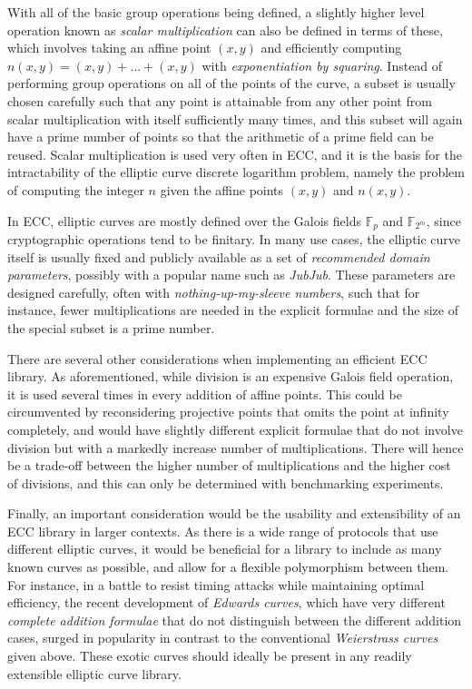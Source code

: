 \documentclass{article}
\theoremstyle{definition}
\newcommand{\F}{\mathbb{F}}
\begin{document}
With all of the basic group operations being defined, a slightly higher level operation known as \emph{scalar multiplication} can also be defined in terms of these, which involves taking an affine point $ (x, y) $ and efficiently computing $ n(x, y) = (x, y) + \dots + (x, y) $ with \emph{exponentiation by squaring}. Instead of performing group operations on all of the points of the curve, a subset is usually chosen carefully such that any point is attainable from any other point from scalar multiplication with itself sufficiently many times, and this subset will again have a prime number of points so that the arithmetic of a prime field can be reused. Scalar multiplication is used very often in ECC, and it is the basis for the intractability of the elliptic curve discrete logarithm problem, namely the problem of computing the integer $ n $ given the affine points $ (x, y) $ and $ n(x, y) $.

\pagebreak

In ECC, elliptic curves are mostly defined over the Galois fields $ \F_p $ and $ \F_{2^m} $, since cryptographic operations tend to be finitary. In many use cases, the elliptic curve itself is usually fixed and publicly available as a set of \emph{recommended domain parameters}, possibly with a popular name such as \emph{JubJub}. These parameters are designed carefully, often with \emph{nothing-up-my-sleeve numbers}, such that for instance, fewer multiplications are needed in the explicit formulae and the size of the special subset is a prime number.

There are several other considerations when implementing an efficient ECC library. As aforementioned, while division is an expensive Galois field operation, it is used several times in every addition of affine points. This could be circumvented by reconsidering projective points that omits the point at infinity completely, and would have slightly different explicit formulae that do not involve division but with a markedly increase number of multiplications. There will hence be a trade-off between the higher number of multiplications and the higher cost of divisions, and this can only be determined with benchmarking experiments.

Finally, an important consideration would be the usability and extensibility of an ECC library in larger contexts. As there is a wide range of protocols that use different elliptic curves, it would be beneficial for a library to include as many known curves as possible, and allow for a flexible polymorphism between them. For instance, in a battle to resist timing attacks while maintaining optimal efficiency, the recent development of \emph{Edwards curves}, which have very different \emph{complete addition formulae} that do not distinguish between the different addition cases, surged in popularity in contrast to the conventional \emph{Weierstrass curves} given above. These exotic curves should ideally be present in any readily extensible elliptic curve library.
\end{document}
